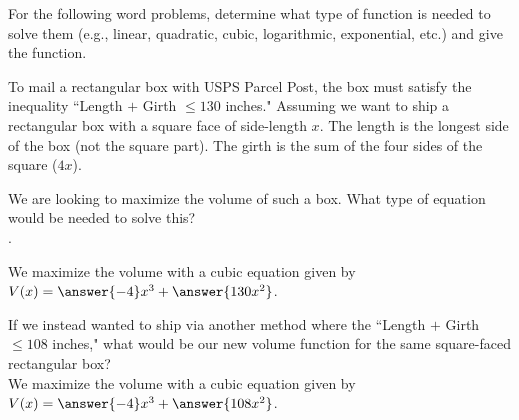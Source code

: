 \documentclass{ximera}
\author{Elizabeth Campolongo}
\begin{document}
\begin{exercise}
For the following word problems, determine what type of function is needed to solve them (e.g., linear, quadratic, cubic, logarithmic, exponential, etc.) and give the function. 
%



To mail a rectangular box with USPS Parcel Post, the box must satisfy the inequality ``Length $+$ Girth $\leq 130$ inches." Assuming we want to ship a rectangular box with a square face of side-length $x$. The length is the longest side of the box (not the square part). The girth is the sum of the four sides of the square ($4x$).

We are looking to maximize the volume of such a box. What type of equation would be needed to solve this?\\
.
%
\begin{exercise}
We maximize the volume with a cubic equation given by $V(x) = \answer{-4}x^3+\answer{130x^2}$.
\begin{exercise}
If we instead wanted to ship via another method where the ``Length $+$ Girth $\leq 108$ inches," what would be our new volume function for the same square-faced rectangular box?\\
We maximize the volume with a cubic equation given by $V(x) = \answer{-4}x^3+\answer{108x^2}$.
\end{exercise}
\end{exercise}


\end{exercise}
\end{document}
